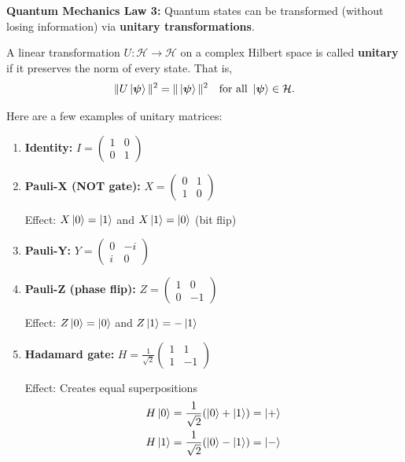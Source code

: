 \textbf{Quantum Mechanics Law 3:} Quantum states can be transformed (without losing information) via \textbf{unitary transformations}.

\begin{definition}
    A linear transformation $U : \mathcal{H} \to \mathcal{H}$ on a complex Hilbert space is called \textbf{unitary} if it preserves the norm of every state. That is,
    \[
        \| U \ket{\boldsymbol{\psi}} \|^2 = \| \ket{\boldsymbol{\psi}} \|^2
        \quad \text{for all } \ket{\boldsymbol{\psi}} \in \mathcal{H}.
    \]
\end{definition}

Here are a few examples of unitary matrices:
\begin{example}\hfill
\begin{enumerate}
\item \textbf{Identity:} $I = \begin{pmatrix} 1 & 0 \\ 0 & 1 \end{pmatrix}$

\item \textbf{Pauli-X (NOT gate):} $X = \begin{pmatrix} 0 & 1 \\ 1 & 0 \end{pmatrix}$

Effect: $X\ket{0} = \ket{1}$ and $X\ket{1} = \ket{0}$ (bit flip)

\item \textbf{Pauli-Y:} $Y = \begin{pmatrix} 0 & -i \\ i & 0 \end{pmatrix}$

\item \textbf{Pauli-Z (phase flip):} $Z = \begin{pmatrix} 1 & 0 \\ 0 & -1 \end{pmatrix}$

Effect: $Z\ket{0} = \ket{0}$ and $Z\ket{1} = -\ket{1}$

\item \textbf{Hadamard gate:} $H = \frac{1}{\sqrt{2}}\begin{pmatrix} 1 & 1 \\ 1 & -1 \end{pmatrix}$

Effect: Creates equal superpositions
\begin{align*}
H\ket{0} &= \frac{1}{\sqrt{2}}(\ket{0} + \ket{1}) = \ket{+} \\
H\ket{1} &= \frac{1}{\sqrt{2}}(\ket{0} - \ket{1}) = \ket{-}
\end{align*}


\end{enumerate}
\end{example}
